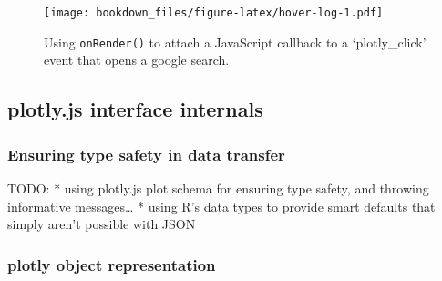 \documentclass[12pt,]{isuthesis}
\newenvironment{Shaded}{\begin{snugshade}}{\end{snugshade}}
\newcommand{\KeywordTok}[1]{\textcolor[rgb]{0.13,0.29,0.53}{\textbf{{#1}}}}
\newcommand{\DataTypeTok}[1]{\textcolor[rgb]{0.13,0.29,0.53}{{#1}}}
\newcommand{\StringTok}[1]{\textcolor[rgb]{0.31,0.60,0.02}{{#1}}}
\newcommand{\NormalTok}[1]{{#1}}
\begin{document}
\begin{Shaded}
\end{Shaded}

\begin{figure}[htbp]
\centering
\texttt{[image: bookdown\_files/figure-latex/hover-log-1.pdf]}
\caption{\label{fig:hover-log}Using \texttt{onRender()} to attach a
JavaScript callback to a `plotly\_click' event that opens a google
search.}
\end{figure}

\subsection{plotly.js interface
internals}\label{plotly.js-interface-internals}

\subsubsection{Ensuring type safety in data
transfer}\label{ensuring-type-safety-in-data-transfer}

TODO: * using plotly.js plot schema for ensuring type safety, and
throwing informative messages\ldots{} * using R's data types to provide
smart defaults that simply aren't possible with JSON

\subsubsection{plotly object
representation}\label{plotly-object-representation}
\end{document}
